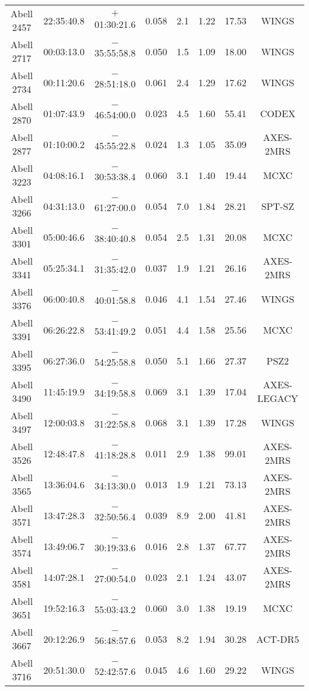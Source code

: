 \begin{table}
\begin{tabular}{cccccccc}
Abell 2457 & 22:35:40.8 & $+$01:30:21.6 & 0.058 & 2.1 & 1.22 & 17.53 & WINGS \\
Abell 2717 & 00:03:13.0 & $-$35:55:58.8 & 0.050 & 1.5 & 1.09 & 18.00 & WINGS \\
Abell 2734 & 00:11:20.6 & $-$28:51:18.0 & 0.061 & 2.4 & 1.29 & 17.62 & WINGS \\
Abell 2870 & 01:07:43.9 & $-$46:54:00.0 & 0.023 & 4.5 & 1.60 & 55.41 & CODEX \\
Abell 2877 & 01:10:00.2 & $-$45:55:22.8 & 0.024 & 1.3 & 1.05 & 35.09 & AXES-2MRS \\
Abell 3223 & 04:08:16.1 & $-$30:53:38.4 & 0.060 & 3.1 & 1.40 & 19.44 & MCXC \\
Abell 3266 & 04:31:13.0 & $-$61:27:00.0 & 0.054 & 7.0 & 1.84 & 28.21 & SPT-SZ \\
Abell 3301 & 05:00:46.6 & $-$38:40:40.8 & 0.054 & 2.5 & 1.31 & 20.08 & MCXC \\
Abell 3341 & 05:25:34.1 & $-$31:35:42.0 & 0.037 & 1.9 & 1.21 & 26.16 & AXES-2MRS \\
Abell 3376 & 06:00:40.8 & $-$40:01:58.8 & 0.046 & 4.1 & 1.54 & 27.46 & WINGS \\
Abell 3391 & 06:26:22.8 & $-$53:41:49.2 & 0.051 & 4.4 & 1.58 & 25.56 & MCXC \\
Abell 3395 & 06:27:36.0 & $-$54:25:58.8 & 0.050 & 5.1 & 1.66 & 27.37 & PSZ2 \\
Abell 3490 & 11:45:19.9 & $-$34:19:58.8 & 0.069 & 3.1 & 1.39 & 17.04 & AXES-LEGACY \\
Abell 3497 & 12:00:03.8 & $-$31:22:58.8 & 0.068 & 3.1 & 1.39 & 17.28 & WINGS \\
Abell 3526 & 12:48:47.8 & $-$41:18:28.8 & 0.011 & 2.9 & 1.38 & 99.01 & AXES-2MRS \\
Abell 3565 & 13:36:04.6 & $-$34:13:30.0 & 0.013 & 1.9 & 1.21 & 73.13 & AXES-2MRS \\
Abell 3571 & 13:47:28.3 & $-$32:50:56.4 & 0.039 & 8.9 & 2.00 & 41.81 & AXES-2MRS \\
Abell 3574 & 13:49:06.7 & $-$30:19:33.6 & 0.016 & 2.8 & 1.37 & 67.77 & AXES-2MRS \\
Abell 3581 & 14:07:28.1 & $-$27:00:54.0 & 0.023 & 2.1 & 1.24 & 43.07 & AXES-2MRS \\
Abell 3651 & 19:52:16.3 & $-$55:03:43.2 & 0.060 & 3.0 & 1.38 & 19.19 & MCXC \\
Abell 3667 & 20:12:26.9 & $-$56:48:57.6 & 0.053 & 8.2 & 1.94 & 30.28 & ACT-DR5 \\
Abell 3716 & 20:51:30.0 & $-$52:42:57.6 & 0.045 & 4.6 & 1.60 & 29.22 & WINGS \\

\end{tabular}
\end{table}
